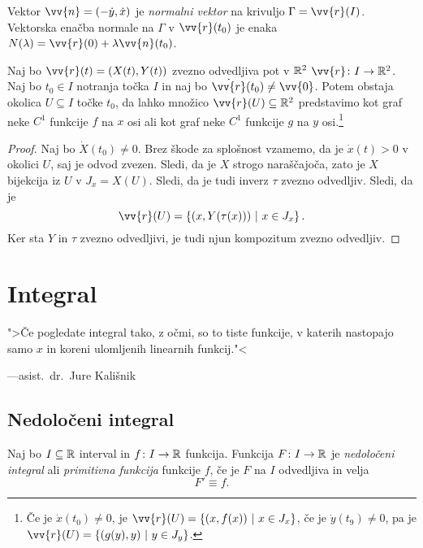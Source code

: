 \documentclass[12pt, a4paper]{article}
\begin{document}
\begin{definicija}
Vektor $\vv{n}=(-\dot{y},\dot{x})$ je \emph{normalni vektor} na krivuljo $\Gamma=\vv{r}(I)$. Vektorska enačba normale na $\Gamma$ v $\vv{r}(t_0)$ je enaka $N(\lambda)=\vv{r}(0)+\lambda\vv{n}(t_0)$.
\end{definicija}

\begin{izrek}
Naj bo $\vv{r}(t)=\left(X(t),Y(t)\right)$ zvezno odvedljiva pot v $\mathbb{R}^2$ $\vv{r}\colon I\to\R^2$. Naj bo $t_0\in I$ notranja točka $I$ in naj bo $\dot{\vv{r}}(t_0)\ne\vv{0}$. Potem obstaja okolica $U\subseteq I$ točke $t_0$, da lahko množico $\vv{r}(U)\subseteq\R^2$ predstavimo kot graf neke $C^1$ funkcije $f$ na $x$ osi ali kot graf neke $C^1$ funkcije $g$ na $y$ osi.\footnote{Če je $\dot{x}(t_0)\ne 0$, je $\vv{r}(U)=\setb{(x,f(x))}{x\in J_x}$, če je $\dot{y}(t_9)\ne 0$, pa je $\vv{r}(U)=\setb{(g(y),y)}{y\in J_y}$.}
\end{izrek}

\begin{proof}
Naj bo $\dot{X}(t_0)\ne 0$. Brez škode za splošnost vzamemo, da je $\dot{x}(t)>0$ v okolici $U$, saj je odvod zvezen. Sledi, da je $X$ strogo naraščajoča, zato je $X$ bijekcija iz $U$ v $J_x=X(U)$. Sledi, da je tudi inverz $\tau$ zvezno odvedljiv. Sledi, da je
\[
\vv{r}(U)=\setb{\left(x,Y(\tau(x))\right)}{x\in J_x}.
\]
Ker sta $Y$ in $\tau$ zvezno odvedljivi, je tudi njun kompozitum zvezno odvedljiv.
\end{proof}

\newpage

\section{Integral}

\epigraph{">Če pogledate integral tako, z očmi, so to tiste funkcije, v katerih nastopajo samo $x$ in koreni ulomljenih linearnih funkcij."<}{---asist.~dr.~Jure Kališnik}

\subsection{Nedoločeni integral}

\begin{okvir}
\begin{definicija}
Naj bo $I\subseteq\mathbb{R}$ interval in $f\colon I\to\mathbb{R}$ funkcija. Funkcija $F\colon I\to\mathbb{R}$ je \emph{nedoločeni integral} ali \emph{primitivna funkcija} funkcije $f$, če je $F$ na $I$ odvedljiva in velja
\[
F'\equiv f.
\]
\end{definicija}
\end{okvir}
\end{document}
